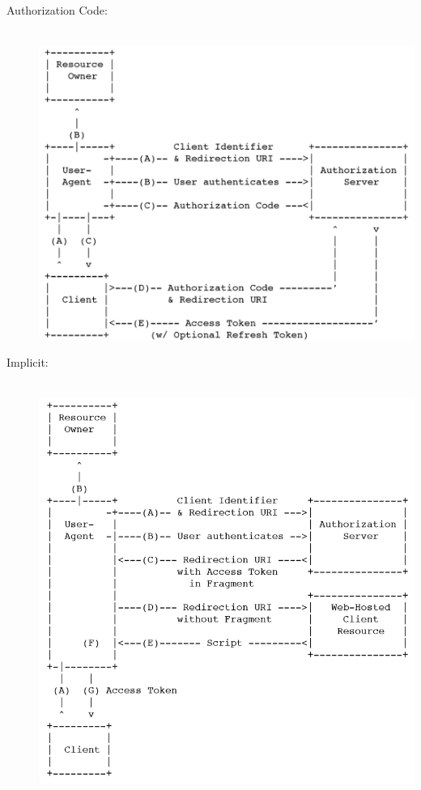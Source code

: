 \documentclass[a4paper, 11pt]{article}
\begin{document}
\begin{description}
	\item[Authorization Code: ] \mbox{}\\
		\includegraphics[keepaspectratio=true,height=15\baselineskip]{auth_code.PNG}
	\item[Implicit: ]\mbox{}\\
		\includegraphics[keepaspectratio=true,height=15\baselineskip]{implicit_grant.PNG}

\end{description}
\end{document}
